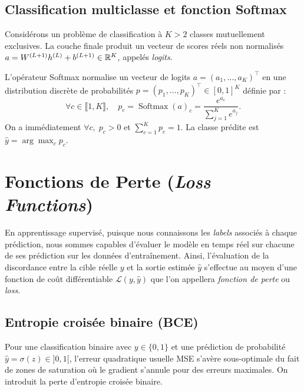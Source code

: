 \subsection{Classification multiclasse et fonction Softmax}

Considérons un problème de classification à $K > 2$ classes mutuellement exclusives. La couche finale produit un vecteur de scores réels non normalisés $a = W^{(L+1)}h^{(L)} + b^{(L+1)} \in \mathbb{R}^K$, appelés \emph{logits}.

\begin{definition}
    L'opérateur Softmax normalise un vecteur de logits $a = (a_1, \dots, a_K)^\top$ en une distribution discrète de probabilités $p = (p_1, \dots, p_K)^\top \in [0, 1]^K$ définie par :
    \begin{equation}
        \forall c \in \llbracket 1, K \rrbracket, \quad p_c = \operatorname{Softmax}(a)_c = \frac{e^{a_c}}{\sum_{j=1}^{K} e^{a_j}}.
    \end{equation}
    On a immédiatement $\forall c, \; p_c > 0$ et $\sum_{c=1}^K p_c = 1$. La classe prédite est $\hat{y} = \arg\max_{c} p_c$.
\end{definition}


\section{Fonctions de Perte (\emph{Loss Functions})}

En apprentissage supervisé, puisque nous connaissons les \emph{labels} associés à chaque prédiction, nous sommes capables d'évaluer le modèle en temps réel sur chacune de ses prédiction sur les données d'entraînement. Ainsi, l'évaluation de la discordance entre la cible réelle $y$ et la sortie estimée $\hat{y}$ s'effectue au moyen d'une fonction de coût différentiable $\mathcal{L}(y, \hat{y})$ que l'on appellera \emph{fonction de perte} ou \emph{loss}. 

\subsection{Entropie croisée binaire (BCE)}

\begin{remark}
    Pour une classification binaire avec $y \in \{0, 1\}$ et une prédiction de probabilité $\hat{y} = \sigma(z) \in ]0, 1[$, l'erreur quadratique usuelle MSE s'avère sous-optimale du fait de zones de saturation où le gradient s'annule pour des erreurs maximales. On introduit la perte d'entropie croisée binaire.    
\end{remark}

